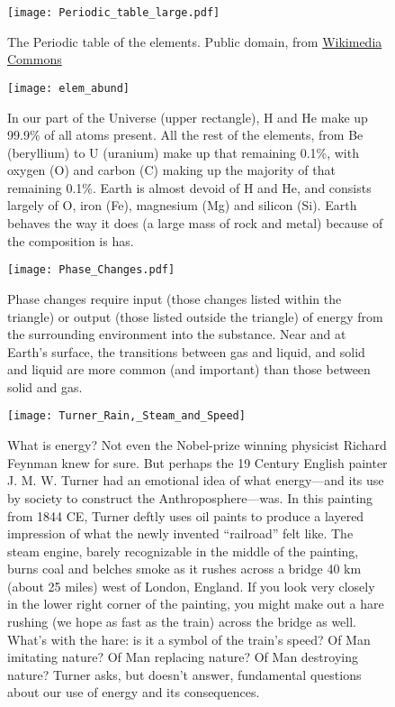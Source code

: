 \begin{figure}[p]
\centering
\texttt{[image: Periodic\_table\_large.pdf]}%
\caption{The Periodic table of the elements. Public domain, from \href{https://commons.wikimedia.org/wiki/File:Periodic_table_large.png}{Wikimedia Commons}}
\label{fig:pt}
\end{figure}

\begin{figure}[p]
\centering
\texttt{[image: elem\_abund]}%
\caption{In our part of the Universe (upper rectangle), H and He make up 99.9\% of all  atoms present. All the rest of the elements, from Be (beryllium) to U (uranium) make up that remaining 0.1\%, with oxygen (O) and carbon (C) making up the majority of that remaining 0.1\%. Earth is almost devoid of H and He, and consists largely of O, iron (Fe), magnesium (Mg) and silicon (Si). Earth behaves the way it does (a large mass of rock and metal) because of the composition is has.}
\label{fig:elem_abund}
\end{figure}


\begin{figure}[p]
\centering
\texttt{[image: Phase\_Changes.pdf]}%
\caption{Phase changes require input (those changes listed within the triangle) or output (those listed outside the triangle) of energy from the surrounding environment into the substance. Near and at Earth's surface, the transitions between gas and liquid, and solid and liquid are more common (and important) than those between solid and gas.}
\label{fig:phase_changes}
\end{figure}

\begin{figure}[p]
\centering
\texttt{[image: Turner\_Rain,\_Steam\_and\_Speed]}%
\caption{What is energy? Not even the Nobel-prize winning physicist Richard Feynman knew for sure. But perhaps the 19 Century English painter J. M. W. Turner had an emotional idea of what energy---and its use by society to construct the Anthroposphere---was. In this painting from 1844 CE, Turner deftly uses oil paints to produce a layered impression of what the newly invented ``railroad'' felt like. The steam engine, barely recognizable in the middle of the painting, burns coal and belches smoke as it rushes across a bridge 40 km (about 25 miles) west of London, England. If you look very closely in the lower right corner of the painting, you might make out a hare rushing (we hope as fast as the train) across the bridge as well. What's with the hare: is it a symbol of the train's speed? Of Man imitating nature? Of Man replacing nature? Of Man destroying nature? Turner asks, but doesn't answer, fundamental questions about our use of energy and its consequences.}
\label{fig:turner_cute_little_bunny}
\end{figure}



